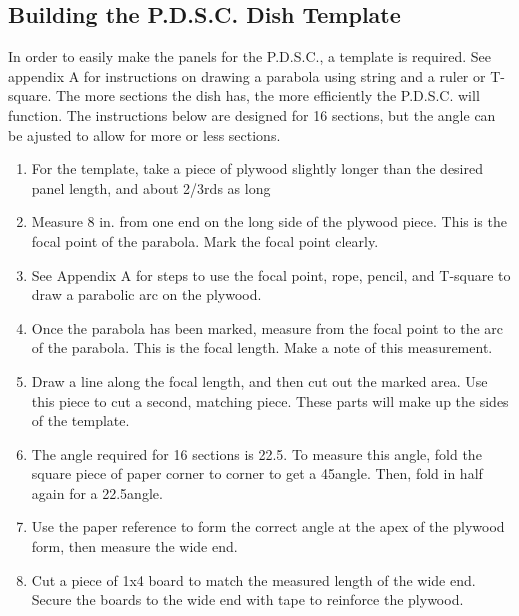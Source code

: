 \documentclass{article}
\begin{document}
        \subsection{Building the P.D.S.C. Dish Template}
        In order to easily make the panels for the P.D.S.C., a template is required.  See appendix A for instructions
        on drawing a parabola using string and a ruler or T-square.  The more sections the dish has,
        the more efficiently the P.D.S.C. will function.  The instructions below are designed for 16 sections,
        but the angle can be ajusted to allow for more or less sections.
            \begin{enumerate}
                \item For the template, take a piece of plywood slightly longer than the desired panel length, and about 2/3rds as long
                \item Measure 8 in. from one end on the long side of the plywood piece. This is the focal point of the parabola. Mark the focal point clearly.
                \item See Appendix A for steps to use the focal point, rope, pencil, and T-square to draw a parabolic arc on the plywood.
                \item Once the parabola has been marked, measure from the focal point to the arc of the parabola.  This is the focal length.  Make a note of this measurement.
                \item Draw a line along the focal length, and then cut out the marked area. Use this piece to cut a second, matching piece. These parts will make up the sides of the template.
                \item The angle required for 16 sections is 22.5\degree. To measure this angle, fold the square piece of paper corner to corner to get a 45\degree angle. Then, fold in half again for a 22.5\degree angle.
                \item Use the paper reference to form the correct angle at the apex of the plywood form, then measure the wide end.
                \item Cut a piece of 1x4 board to match the measured length of the wide end.  Secure the boards to the wide end with tape to reinforce the plywood.
                \begin{figure}[!htb]

\end{figure}
\end{enumerate}
\end{document}
